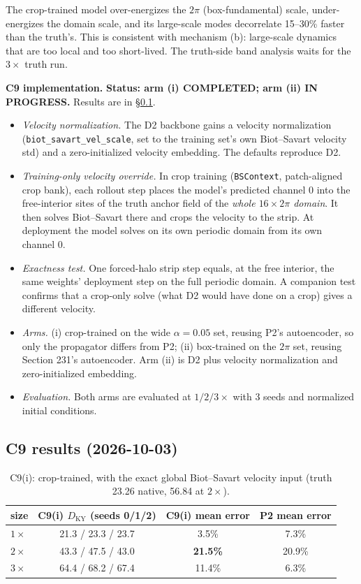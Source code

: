 \documentclass[11pt]{article}
\begin{document}
The crop-trained model over-energizes the $2\pi$ (box-fundamental)
scale, under-energizes the domain scale, and its large-scale modes
decorrelate 15--30\% faster than the truth's. This is consistent with
mechanism (b): large-scale dynamics that are too local and too short-lived.
The truth-side band analysis waits for the $3\times$ truth run.

\textbf{C9 implementation.} \textbf{Status: arm (i) COMPLETED; arm (ii)
IN PROGRESS.} Results are in \S\ref{sec:c9_results}.
\begin{itemize}[leftmargin=*]
\item \emph{Velocity normalization.} The D2 backbone gains a velocity
  normalization (\texttt{biot\_savart\_vel\_scale}, set to the training
  set's own Biot--Savart velocity std) and a zero-initialized velocity
  embedding. The defaults reproduce D2.
\item \emph{Training-only velocity override.} In crop training
  (\texttt{BSContext}, patch-aligned crop bank), each rollout step places
  the model's predicted channel 0 into the free-interior sites of the
  truth anchor field of the \emph{whole $16\times2\pi$ domain}. It then
  solves Biot--Savart there and crops the velocity to the strip. At
  deployment the model solves on its own periodic domain from its own
  channel 0.
\item \emph{Exactness test.} One forced-halo strip step equals, at the
  free interior, the same weights' deployment step on the full periodic
  domain. A companion test confirms that a crop-only solve (what D2 would
  have done on a crop) gives a different velocity.
\item \emph{Arms.} (i) crop-trained on the wide $\alpha{=}0.05$ set,
  reusing P2's autoencoder, so only the propagator differs from P2;
  (ii) box-trained on the $2\pi$ set, reusing Section 231's autoencoder.
  Arm (ii) is D2 plus velocity normalization and zero-initialized
  embedding.
\item \emph{Evaluation.} Both arms are evaluated at $1/2/3\times$ with 3
  seeds and normalized initial conditions.
\end{itemize}

\subsection{C9 results (2026-10-03)}
\label{sec:c9_results}

\begin{table}[h]
\centering
\small
\begin{tabular}{lccc}
\toprule
size & C9(i) $D_{\mathrm{KY}}$ (seeds 0/1/2) & C9(i) mean error & P2 mean error \\
\midrule
$1\times$ & 21.3 / 23.3 / 23.7 & 3.5\% & 7.3\% \\
$2\times$ & 43.3 / 47.5 / 43.0 & \textbf{21.5\%} & 20.9\% \\
$3\times$ & 64.4 / 68.2 / 67.4 & 11.4\% & 6.3\% \\
\bottomrule
\end{tabular}
\caption{C9(i): crop-trained, with the exact global Biot--Savart velocity
input (truth 23.26 native, 56.84 at $2\times$).}
\label{tab:c9i}
\end{table}
\end{document}

